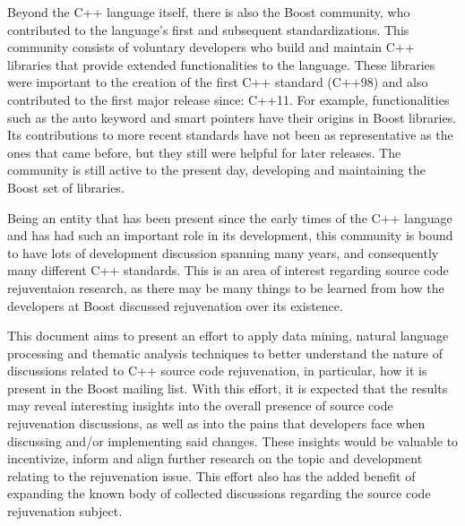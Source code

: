 Beyond the C++ language itself, there is also the Boost community, who contributed to the language's first and subsequent standardizations. This community consists of voluntary developers who build and maintain C++ libraries that provide extended functionalities to the language. These libraries were important to the creation of the first C++ standard (C++98) and also contributed to the first major release since: C++11. For example, functionalities such as the auto keyword and smart pointers have their origins in Boost libraries\cite{schaling2014boost}. Its contributions to more recent standards have not been as representative as the ones that came before, but they still were helpful for later releases. The community is still active to the present day, developing and maintaining the Boost set of libraries.

Being an entity that has been present since the early times of the C++ language and has had such an important role in its development, this community is bound to have lots of development discussion spanning many years, and consequently many different C++ standards. This is an area of interest regarding source code rejuventaion research, as there may be many things to be learned from how the developers at Boost discussed rejuvenation over its existence.

This document aims to present an effort to apply data mining, natural language processing and thematic analysis techniques to better understand the nature of discussions related to C++ source code rejuvenation, in particular, how it is present in the Boost mailing list. With this effort, it is expected that the results may reveal interesting insights into the overall presence of source code rejuvenation discussions, as well as into the pains that developers face when discussing and/or implementing said changes. These insights would be valuable to incentivize, inform and align further research on the topic and development relating to the rejuvenation issue. This effort also has the added benefit of expanding the known body of collected discussions regarding the source code rejuvenation subject.



